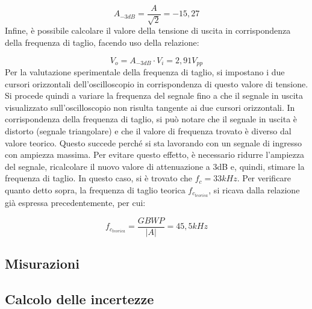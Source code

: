\[A_{-3dB}=\frac{A}{\sqrt{2}}=-15,27\]
Infine, è possibile calcolare il valore della tensione di uscita in corrispondenza della frequenza di
taglio, facendo uso della relazione:

\[V_o=A_{-3dB} \cdot V_i=2,91V_{pp}\]
Per la valutazione sperimentale della frequenza di taglio, si impostano i due cursori orizzontali dell’oscilloscopio in corrispondenza di questo valore di tensione. Si procede quindi a variare la frequenza del segnale fino a che il segnale in uscita visualizzato sull’oscilloscopio non risulta tangente ai due cursori orizzontali. In corrispondenza della frequenza di taglio, si può notare che il segnale in uscita è distorto (segnale triangolare) e che il valore di frequenza trovato è diverso dal valore teorico. Questo succede perché si sta lavorando con un segnale di ingresso con ampiezza massima. Per evitare questo effetto, è necessario ridurre l’ampiezza del segnale, ricalcolare il nuovo valore di attenuazione a 3dB e, quindi, stimare la frequenza di taglio. In questo caso, si è trovato che \(f_c=33kHz\).
Per verificare quanto detto sopra, la frequenza di taglio teorica \(f_{c_{teorica}}\), si ricava dalla relazione già espressa precedentemente, per cui:

\[f_{c_{teorica}}=\frac{GBWP}{|A|}=45,5kHz\]
\subsection{Misurazioni}



\subsection{Calcolo delle incertezze}